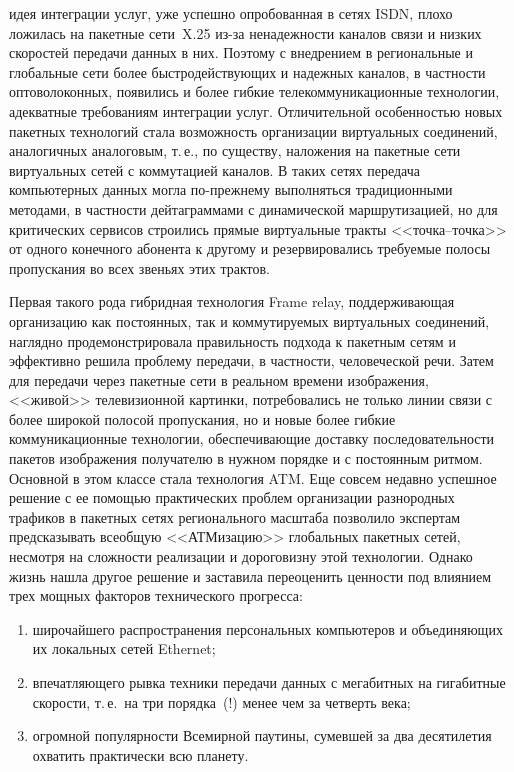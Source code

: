\begin{multicols}{2}
\noindent
идея интеграции услуг, уже успешно 
опробованная в %
сетях ISDN, плохо ложилась на пакетные сети~X.25 из-за ненадежности 
каналов связи и низких скоростей передачи данных в них. Поэтому с внедре\-нием в 
региональные и глобальные сети более %
быст\-ро\-действующих и надежных каналов, в 
частности %
 оптоволоконных, появились и более гибкие телекоммуникационные технологии, 
адекватные требованиям интеграции услуг. Отличительной особенностью новых пакетных 
технологий стала %
 возможность организации виртуальных соединений, аналогичных 
аналоговым, т.\,е., по существу, наложения на пакетные сети виртуальных сетей с 
коммутацией каналов. В таких сетях передача компьютерных данных могла по-прежнему 
выполняться традиционными методами, в частности дейтаграммами с динамической 
маршрутизацией, но для критических сервисов строились прямые виртуальные тракты 
<<точка--точка>> от одного конечного абонента к другому и резервировались требуемые 
полосы пропускания во всех звеньях этих трактов.
     
     Первая такого рода гибридная технология Frame relay, поддерживающая организацию 
как постоянных, так и коммутируемых виртуальных соединений, наглядно 
продемонстрировала правильность подхода к пакетным сетям и эффективно решила 
проблему передачи, в частности, человеческой речи. Затем для передачи через пакетные сети 
в реальном времени изображения, <<живой>> телевизионной картинки, потребовались не 
только линии связи с более широкой полосой пропускания, но и новые более гибкие 
коммуникационные технологии, обеспечивающие доставку последовательности пакетов 
изображения получателю в нужном порядке и с постоянным ритмом. Основной в этом 
классе стала технология ATM. Еще совсем недавно успешное решение с ее помощью 
практических проблем организации разнородных трафиков в пакетных сетях регионального 
масштаба позволило экспертам предсказывать всеобщую <<АТМизацию>> глобальных 
пакетных сетей, несмотря на сложности реализации и дороговизну этой технологии. Однако 
жизнь нашла другое решение и заставила переоценить ценности под влиянием трех мощных 
факторов технического прогресса:
     \begin{enumerate}[(1)]
\item широчайшего распространения персональных компьютеров и объединяющих их 
локальных сетей Ethernet;
\item впечатляющего рывка техники передачи данных с мегабитных на гигабитные скорости, 
т.\,е.\ на три порядка~(!) менее чем за четверть века;
\item огромной популярности Всемирной паутины, сумевшей за два десятилетия охватить 
практически всю планету.
\end{enumerate}
     

\end{multicols}
